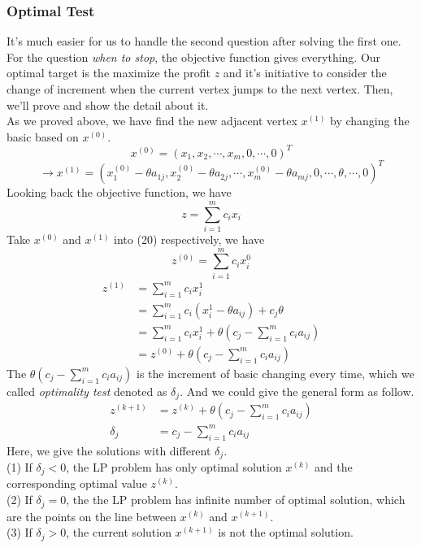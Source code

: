 \documentclass[12pt,a4paper]{article}
\begin{document}
	\subsubsection{Optimal Test}
	\indent It's much easier for us to handle the second question after solving the first one. For the question \textit{when to stop}, the objective function gives everything. Our optimal target is the maximize the profit $z$ and it's initiative to consider the change of increment when the current vertex jumps to the next vertex. Then, we'll prove and show the detail about it.\\
	As we proved above, we have find the new adjacent vertex $x^{(1)}$ by changing the basic based on $x^{(0)}$.
	$$x^{(0)}=(x_1,x_2,\cdots,x_m,0,\cdots,0)^T$$
	$$\to x^{(1)}=(x_1^{(0)}-\theta a_{1j},x_2^{(0)}-\theta a_{2j},\cdots,x_m^{(0)}-\theta a_{mj},0,\cdots,\theta,\cdots,0)^T$$
	\indent Looking back the objective function, we have
	\begin{equation}
		z=\sum_{i=1}^mc_ix_i
	\end{equation}
	\indent Take $x^{(0)}$ and $x^{(1)}$ into (20) respectively, we have
	\begin{equation}
		z^{(0)}=\sum_{i=1}^mc_ix_i^0
	\end{equation}
	\begin{equation}
	\begin{align}
		z^{(1)}&=\sum_{i=1}^mc_ix_i^1 \\
		&=\sum_{i=1}^mc_i(x_i^1-\theta a_{ij})+c_j\theta \\
		&=\sum_{i=1}^mc_ix_i^1+\theta (c_j-\sum_{i=1}^mc_ia_{ij}) \\
		&=z^{(0)}+\theta(c_j-\sum_{i=1}^mc_ia_{ij})
	\end{align}
	\end{equation}
	\indent The $\theta(c_j-\sum_{i=1}^m c_i a_{ij})$ is the increment of basic changing every time, which we called \textit{optimality test} denoted as $\delta_j$. And we could give the general form as follow.
	\begin{equation}
	\begin{align}
		z^{(k+1)} &= z^{(k)}+\theta(c_j-\sum_{i=1}^mc_ia_{ij}) \\
		\delta_j &= c_j-\sum_{i=1}^mc_ia_{ij}
	\end{align}
	\end{equation}
	\indent Here, we give the solutions with different $\delta_j$.\\
	(1) If $\delta_j< 0$, the LP problem has only optimal solution $x^{(k)}$ and the corresponding optimal value $z^{(k)}$.\\
	(2) If $\delta_j= 0$, the the LP problem has infinite number of optimal solution, which are the points on the line between $x^{(k)}$ and $x^{(k+1)}$.\\
	(3) If $\delta_j> 0$, the current solution $x^{(k+1)}$ is not the optimal solution.\\
\end{document}
